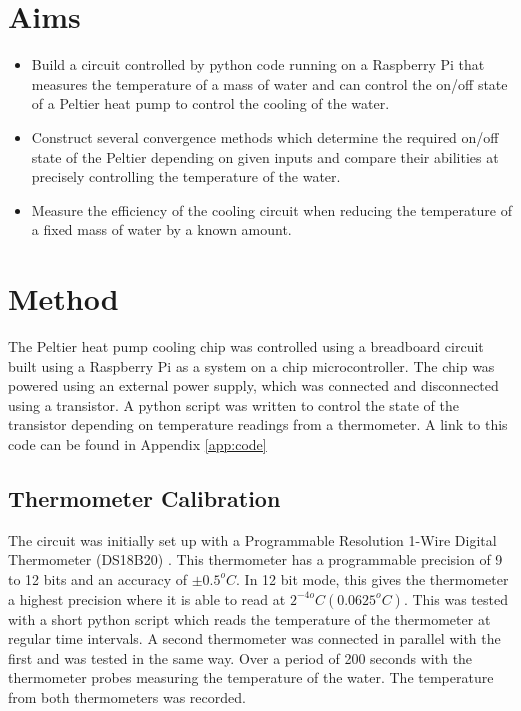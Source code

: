\documentclass[10pt]{article}
\begin{document}


\section*{Aims}
\begin{itemize}
    \item Build a circuit controlled by python code running on a Raspberry Pi that measures the temperature of a mass of water and can control the on/off state of a Peltier heat pump \cite{peltier}\cite{pelt} to control the cooling of the water. 
    \item Construct several convergence methods which determine the required on/off state of the Peltier depending on given inputs and compare their abilities at precisely controlling the temperature of the water.
    \item Measure the efficiency of the cooling circuit when reducing the temperature of a fixed mass of water by a known amount.
\end{itemize}
\section*{Method}
The Peltier heat pump cooling chip was controlled using a breadboard circuit built using a Raspberry Pi \cite{rpi} as a system on a chip microcontroller. The chip was powered using an external power supply, which was connected and disconnected using a transistor. A python script was written to control the state of the transistor depending on temperature readings from a thermometer. A link to this code can be found in Appendix \ref{app:code}

\subsection*{Thermometer Calibration}
The circuit was initially set up with a Programmable Resolution 1-Wire Digital Thermometer (DS18B20) \cite{thermometer}. This thermometer has a programmable precision of 9 to 12 bits and an accuracy of $\pm 0.5^oC$. In 12 bit mode, this gives the thermometer a highest precision where it is able to read at $2^{-4o} C (0.0625^o C)$. This was tested with a short python script which reads the temperature of the thermometer at regular time intervals. A second thermometer was connected in parallel with the first and was tested in the same way. Over a period of 200 seconds with the thermometer probes measuring the temperature of the water. The temperature from both thermometers was recorded.
\end{document}
